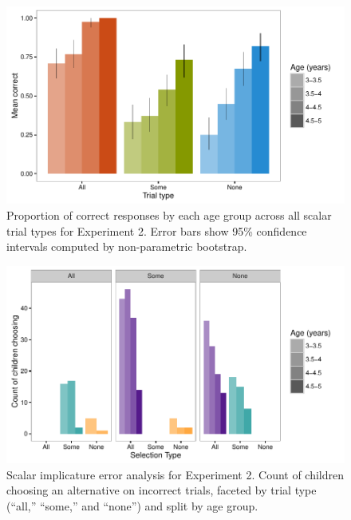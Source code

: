 \documentclass[man]{apa2}
\begin{document}
{\begin{figure}
 \begin{center}
  \includegraphics[width=6in]{figures/exp2_performance.pdf}
  \caption{\label{fig:exp2_perf} Proportion of correct responses by each age group across all scalar trial types for Experiment 2. Error bars show 95\% confidence intervals computed by non-parametric bootstrap.}
 \end{center}
\end{figure}

\newpage

\begin{figure}
 \begin{center}
  \includegraphics[width=6in]{figures/exp2_wrong.pdf}
  \caption{\label{fig:exp2_wrong} Scalar implicature error analysis for Experiment 2. Count of children choosing an alternative on incorrect trials, faceted by trial type (``all,'' ``some,'' and ``none'') and split by age group.}
 \end{center}
\end{figure}

}
\end{document}
